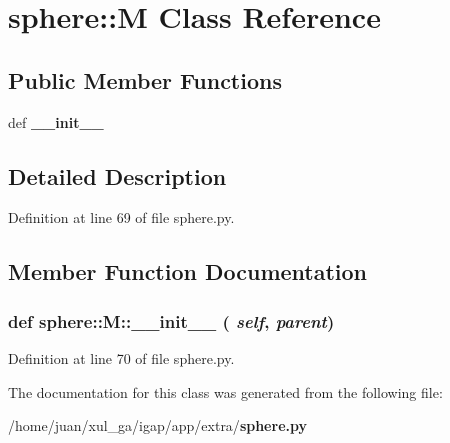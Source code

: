 \section{sphere::M Class Reference}
\label{classsphere_1_1M}
\subsection*{Public Member Functions}
\begin{CompactItemize}
\item 
def {\bf \_\-\_\-init\_\-\_\-}
\end{CompactItemize}


\subsection{Detailed Description}


Definition at line 69 of file sphere.py.

\subsection{Member Function Documentation}
\subsubsection{\setlength{\rightskip}{0pt plus 5cm}def sphere::M::\_\-\_\-init\_\-\_\- ( {\em self},  {\em parent})}\label{classsphere_1_1M_752b47a409fb0f0d1fea1d6ddd32f229}




Definition at line 70 of file sphere.py.

The documentation for this class was generated from the following file:\begin{CompactItemize}
\item 
/home/juan/xul\_\-ga/igap/app/extra/{\bf sphere.py}\end{CompactItemize}
